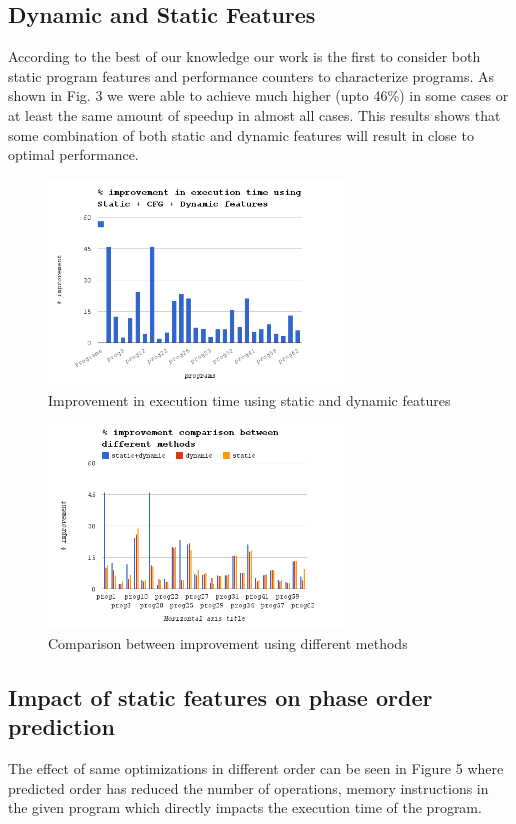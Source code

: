 \documentclass[10pt]{sigplanconf}
\begin{document}
\subsection {Dynamic and Static Features}
 According to the best of our knowledge our work is the first to consider both static program features and performance counters to characterize programs. As shown in Fig. 3 we were able to achieve much higher (upto 46\%) in some cases or at least the same amount of speedup in almost all cases. This results shows that some combination of both static and dynamic features will result in close to optimal performance.


\begin{figure}[ht!]
\centering
\includegraphics[width=80mm]{dyn_stat_features.png}
\caption{Improvement in execution time using static and dynamic features}
\label{overflow}
\end{figure}

\begin{figure}[ht!]
\centering
\includegraphics[width=80mm]{combined.png}
\caption{Comparison between improvement using different methods}
\label{overflow}
\end{figure}


\subsection {Impact of static features on phase order prediction}
The effect of same optimizations in different order can be seen in Figure 5 where predicted order has reduced the number of operations, memory instructions in the given program which directly impacts the execution time of the program.
\end{document}

